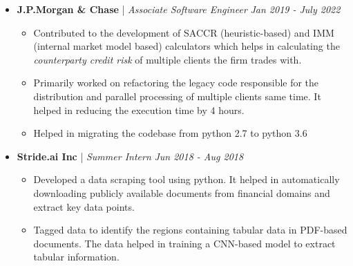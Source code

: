 \documentclass[11pt,a4paper]{article}
\begin{document}
{
\colorbox{gray}{}
  \begin{itemize}
      \item \textbf{J.P.Morgan \& Chase} | \emph{Associate Software Engineer} \hfill \textit{Jan 2019 - July 2022}  
      \begin{itemize}
          \item Contributed to the development of SACCR (heuristic-based) and IMM (internal market model based) calculators which helps in calculating the \emph{counterparty credit risk} of multiple clients the firm trades with.
          \item Primarily worked on refactoring the legacy code responsible for the distribution and parallel processing of multiple clients same time. It helped in reducing the execution time by 4 hours.
          \item Helped in migrating the codebase from python 2.7 to python 3.6
      \end{itemize}
      \item \textbf{Stride.ai Inc} | \emph{Summer Intern} \hfill \textit{Jun 2018 - Aug 2018}    
      \begin{itemize}
          \item Developed a data scraping tool using python. It helped in automatically downloading publicly available documents from financial domains and extract key data points.
          \item Tagged data to identify the regions containing tabular data in PDF-based documents. The data helped in training a CNN-based model to extract tabular information. 
      \end{itemize}
  \end{itemize}
}
\end{document}
